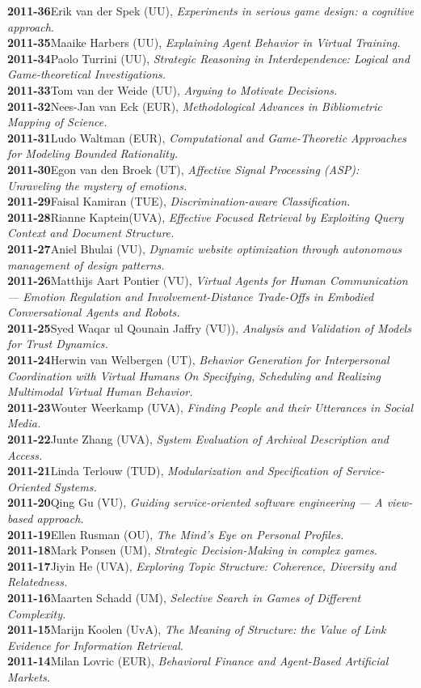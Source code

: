 \newcommand{\SIKSdiss}[3]{{\bf #1}\hspace*{1ex}#2, {\it #3.}\\}

\SIKSdiss{2011-36}{Erik van der Spek (UU)}{Experiments in serious game design: a cognitive approach}
\SIKSdiss{2011-35}{Maaike Harbers (UU)}{Explaining Agent Behavior in Virtual Training}
\SIKSdiss{2011-34}{Paolo Turrini (UU)}{Strategic Reasoning in Interdependence: Logical and Game-theoretical Investigations}
\SIKSdiss{2011-33}{Tom van der Weide (UU)}{Arguing to Motivate Decisions}
\SIKSdiss{2011-32}{Nees-Jan van Eck (EUR)}{Methodological Advances in Bibliometric Mapping of Science}
\SIKSdiss{2011-31}{Ludo Waltman (EUR)}{Computational and Game-Theoretic Approaches for Modeling Bounded Rationality}
\SIKSdiss{2011-30}{Egon van den Broek (UT)}{Affective Signal Processing (ASP): Unraveling the mystery of emotions}
\SIKSdiss{2011-29}{Faisal Kamiran (TUE)}{Discrimination-aware Classification}
\SIKSdiss{2011-28}{Rianne Kaptein(UVA)}{Effective Focused Retrieval by Exploiting Query Context and Document Structure}
\SIKSdiss{2011-27}{Aniel Bhulai (VU)}{Dynamic website optimization through autonomous management of design patterns}
\SIKSdiss{2011-26}{Matthijs Aart Pontier (VU)}{Virtual Agents for Human Communication --- Emotion Regulation and Involvement-Distance Trade-Offs in Embodied Conversational Agents and Robots}
\SIKSdiss{2011-25}{Syed Waqar ul Qounain Jaffry (VU))}{Analysis and Validation of Models for Trust Dynamics}
\SIKSdiss{2011-24}{Herwin van Welbergen (UT)}{Behavior Generation for Interpersonal Coordination with Virtual Humans On Specifying, Scheduling and Realizing Multimodal Virtual Human Behavior}
\SIKSdiss{2011-23}{Wouter Weerkamp (UVA)}{Finding People and their Utterances in Social Media}
\SIKSdiss{2011-22}{Junte Zhang (UVA)}{System Evaluation of Archival Description and Access}
\SIKSdiss{2011-21}{Linda Terlouw (TUD)}{Modularization and Specification of Service-Oriented Systems}
\SIKSdiss{2011-20}{Qing Gu (VU)}{Guiding service-oriented software engineering --- A view-based approach}
\SIKSdiss{2011-19}{Ellen Rusman (OU)}{The Mind's Eye on Personal Profiles}
\SIKSdiss{2011-18}{Mark Ponsen (UM)}{Strategic Decision-Making in complex games}
\SIKSdiss{2011-17}{Jiyin He (UVA)}{Exploring Topic Structure: Coherence, Diversity and Relatedness}
\SIKSdiss{2011-16}{Maarten Schadd (UM)}{Selective Search in Games of Different Complexity}
\SIKSdiss{2011-15}{Marijn Koolen (UvA)}{The Meaning of Structure: the Value of Link Evidence for Information Retrieval}
\SIKSdiss{2011-14}{Milan Lovric (EUR)}{Behavioral Finance and Agent-Based Artificial Markets}
